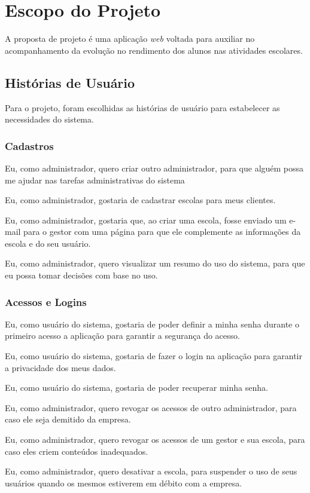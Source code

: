 \chapter{Escopo do Projeto}
A proposta de projeto é uma aplicação \textit{web} voltada para auxiliar no acompanhamento da evolução no rendimento dos alunos nas atividades escolares.

\section{Histórias de Usuário}
Para o projeto, foram escolhidas as histórias de usuário para estabelecer as necessidades do sistema. 

\subsection{Cadastros}
Eu, como administrador, quero criar outro administrador, para que alguém possa me ajudar nas tarefas administrativas do sistema

Eu, como administrador, gostaria de cadastrar escolas para meus clientes.

Eu, como administrador, gostaria que, ao criar uma escola, fosse enviado um e-mail para o gestor com uma página para que ele complemente as informações da escola e do seu usuário.

Eu, como administrador, quero visualizar um resumo do uso do sistema, para que eu possa tomar decisões com base no uso.

\subsection{Acessos e Logins}

Eu, como usuário do sistema, gostaria de poder definir a minha senha durante o primeiro acesso a aplicação para garantir a segurança do acesso.

Eu, como usuário do sistema, gostaria de fazer o login na aplicação para garantir a privacidade dos meus dados.

Eu, como usuário do sistema, gostaria de poder recuperar minha senha.

Eu, como administrador, quero revogar os acessos de outro administrador, para caso ele seja demitido da empresa.

Eu, como administrador, quero revogar os acessos de um gestor e sua escola, para caso eles criem conteúdos inadequados.

Eu, como administrador, quero desativar a escola, para suspender o uso de seus usuários quando os mesmos estiverem em débito com a empresa.

